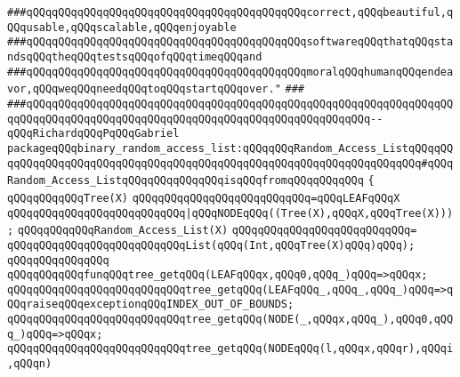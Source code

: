 \verb|###qQQqqQQqqQQqqQQqqQQqqQQqqQQqqQQqqQQqqQQqqQQqcorrect,qQQqbeautiful,qQQqusable,qQQqscalable,qQQqenjoyable|\newline
\verb|###qQQqqQQqqQQqqQQqqQQqqQQqqQQqqQQqqQQqqQQqqQQqsoftwareqQQqthatqQQqstandsqQQqtheqQQqtestsqQQqofqQQqtimeqQQqand|\newline
\verb|###qQQqqQQqqQQqqQQqqQQqqQQqqQQqqQQqqQQqqQQqqQQqmoralqQQqhumanqQQqendeavor,qQQqweqQQqneedqQQqtoqQQqstartqQQqover."|\newline
\verb|###|\newline
\verb|###qQQqqQQqqQQqqQQqqQQqqQQqqQQqqQQqqQQqqQQqqQQqqQQqqQQqqQQqqQQqqQQqqQQqqQQqqQQqqQQqqQQqqQQqqQQqqQQqqQQqqQQqqQQqqQQqqQQqqQQqqQQq--qQQqRichardqQQqPqQQqGabriel|\newline
\newline
\newline
\newline
\verb|packageqQQqbinary_random_access_list:qQQqqQQqRandom_Access_ListqQQqqQQqqQQqqQQqqQQqqQQqqQQqqQQqqQQqqQQqqQQqqQQqqQQqqQQqqQQqqQQqqQQqqQQq#qQQqRandom_Access_ListqQQqqQQqqQQqqQQqisqQQqfromqQQqqQQqqQQq|\newline
\verb|{|\newline
\verb|qQQqqQQqqQQqTree(X)|\newline
\verb|qQQqqQQqqQQqqQQqqQQqqQQqqQQq=qQQqLEAFqQQqX|\newline
\verb|qQQqqQQqqQQqqQQqqQQqqQQqqQQq|\verb#|qQQqNODEqQQq((Tree(X),qQQqX,qQQqTree(X)));#\newline
\newline
\verb|qQQqqQQqqQQqRandom_Access_List(X)|\newline
\verb|qQQqqQQqqQQqqQQqqQQqqQQqqQQq=|\newline
\verb|qQQqqQQqqQQqqQQqqQQqqQQqqQQqList(qQQq(Int,qQQqTree(X)qQQq)qQQq);|\newline
\verb|qQQqqQQqqQQqqQQq|\newline
\verb|qQQqqQQqqQQqfunqQQqtree_getqQQq(LEAFqQQqx,qQQq0,qQQq_)qQQq=>qQQqx;|\newline
\verb|qQQqqQQqqQQqqQQqqQQqqQQqqQQqtree_getqQQq(LEAFqQQq_,qQQq_,qQQq_)qQQq=>qQQqraiseqQQqexceptionqQQqINDEX_OUT_OF_BOUNDS;|\newline
\verb|qQQqqQQqqQQqqQQqqQQqqQQqqQQqtree_getqQQq(NODE(_,qQQqx,qQQq_),qQQq0,qQQq_)qQQq=>qQQqx;|\newline
\newline
\verb|qQQqqQQqqQQqqQQqqQQqqQQqqQQqtree_getqQQq(NODEqQQq(l,qQQqx,qQQqr),qQQqi,qQQqn)|\newline
